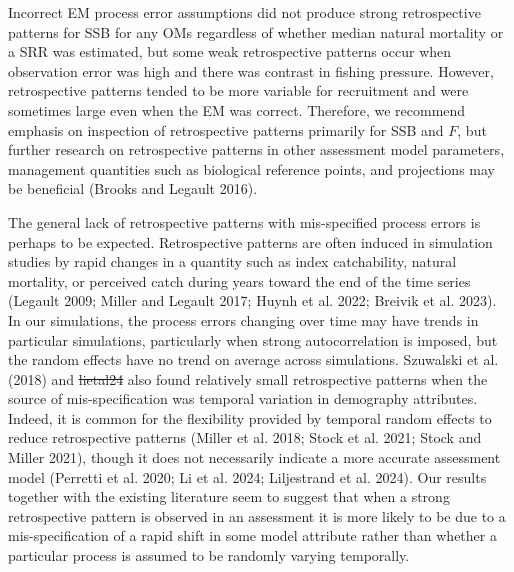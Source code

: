\documentclass[
  12pt,
]{article}
\makeatletter
\providecommand{\DIFadd}[1]{{\protect\color{blue}\uwave{#1}}} %
\providecommand{\DIFdel}[1]{{\protect\color{red}\sout{#1}}} %
\providecommand{\DIFaddbegin}{} %
\providecommand{\DIFaddend}{} %
\providecommand{\DIFdelbegin}{} %
\providecommand{\DIFdelend}{} %
\newcommand{\DIFscaledelfig}{0.5}
\newlength{\DIFdelgraphicswidth} %
\newlength{\DIFdelgraphicsheight} %
\newcommand{\DIFaddincludegraphics}[2][]{{\color{blue}\fbox{\DIFOincludegraphics[#1]{#2}}}} %
\newcommand{\DIFdelincludegraphics}[2][]{%
\sbox{\DIFdelgraphicsbox}{\DIFOincludegraphics[#1]{#2}}%
\settoboxwidth{\DIFdelgraphicswidth}{\DIFdelgraphicsbox} %
\settoboxtotalheight{\DIFdelgraphicsheight}{\DIFdelgraphicsbox} %
\scalebox{\DIFscaledelfig}{%
\parbox[b]{\DIFdelgraphicswidth}{\usebox{\DIFdelgraphicsbox}\\[-\baselineskip] \rule{\DIFdelgraphicswidth}{0em}}\llap{\resizebox{\DIFdelgraphicswidth}{\DIFdelgraphicsheight}{%
\setlength{\unitlength}{\DIFdelgraphicswidth}%
\begin{picture}(1,1)%
\thicklines\linethickness{2pt} %
{\color[rgb]{1,0,0}\put(0,0){\framebox(1,1){}}}%
{\color[rgb]{1,0,0}\put(0,0){\line( 1,1){1}}}%
{\color[rgb]{1,0,0}\put(0,1){\line(1,-1){1}}}%
\end{picture}%
}\hspace*{3pt}}} %
} %
\DeclareRobustCommand{\DIFaddbegin}{\DIFOaddbegin \let\includegraphics\DIFaddincludegraphics} %
\DeclareRobustCommand{\DIFaddend}{\DIFOaddend \let\includegraphics\DIFOincludegraphics} %
\DeclareRobustCommand{\DIFdelbegin}{\DIFOdelbegin \let\includegraphics\DIFdelincludegraphics} %
\DeclareRobustCommand{\DIFdelend}{\DIFOaddend \let\includegraphics\DIFOincludegraphics} %
\let\sout@orig\sout %
\renewcommand{\sout}[1]{\ifmmode\text{\sout@orig{\ensuremath{#1}}}\else\sout@orig{#1}\fi} %
\makeatother
\begin{document}
Incorrect EM process error assumptions did not produce strong
retrospective patterns for SSB for any OMs regardless of whether median
natural mortality or a SRR was estimated, but some weak retrospective
patterns occur when observation error was high and there was contrast in
fishing pressure. However, retrospective patterns tended to be more
variable for recruitment and were sometimes large even when the EM was
correct. Therefore, we recommend emphasis on inspection of retrospective
patterns primarily for SSB and \(F\), but further research on
retrospective patterns in other assessment model parameters, management
quantities such as biological reference points, and projections may be
beneficial (Brooks and Legault 2016).

The general lack of retrospective patterns with mis-specified process
errors is perhaps to be expected. Retrospective patterns are often
induced in simulation studies by rapid changes in a quantity such as
index catchability, natural mortality, or perceived catch during years
toward the end of the time series (Legault 2009; Miller and Legault
2017; Huynh et al. 2022; Breivik et al. 2023). In our simulations, the
process errors changing over time may have trends in particular
simulations, particularly when strong autocorrelation is imposed, but
the random effects have no trend on average across simulations.
Szuwalski et al. (2018) and \DIFdelbegin \DIFdel{lietal24 }\DIFdelend \DIFaddbegin \DIFadd{Li et al. (2024) }\DIFaddend also found relatively small
retrospective patterns when the source of mis-specification was temporal
variation in demography attributes. Indeed, it is common for the
flexibility provided by temporal random effects to reduce retrospective
patterns (Miller et al. 2018; Stock et al. 2021; Stock and Miller 2021),
though it does not necessarily indicate a more accurate assessment model
(Perretti et al. 2020; Li et al. 2024; Liljestrand et al. 2024). Our
results together with the existing literature seem to suggest that when
a strong retrospective pattern is observed in an assessment it is more
likely to be due to a mis-specification of a rapid shift in some model
attribute rather than whether a particular process is assumed to be
randomly varying temporally.

\DIFdelbegin %
\DIFdelend \DIFaddbegin \subsection*{\DIFadd{Conclusions}}\label{conclusions}
\DIFaddend {}
\end{document}
